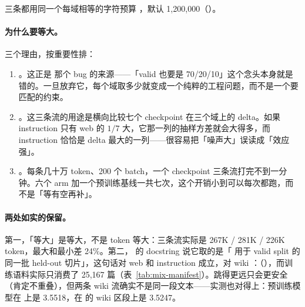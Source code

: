 三条都用同一个每域相等的字符预算 ，默认 1{,}200{,}000（）。

\paragraph{为什么要等大。}三个理由，按重要性排：

\begin{enumerate}[label=(\arabic*)]\itemsep3pt
  \item {}。这正是  那个 bug 的来源——「valid 也要是 70/20/10」这个念头本身就是错的。一旦放弃它，每个域取多少就变成一个纯粹的工程问题，而不是一个要匹配的约束。
  \item {}。这三条流的用途是横向比较七个 checkpoint 在三个域上的 delta。如果 instruction 只有 web 的 $1/7$ 大，它那一列的抽样方差就会大得多，而 instruction 恰恰是 delta 最大的一列——很容易把「噪声大」误读成「效应强」。
  \item {}。每条几十万 token、200 个 batch，一个 checkpoint 三条流打完不到一分钟。六个 arm 加一个预训练基线一共七次，这个开销小到可以每次都跑，而不是「等有空再补」。
\end{enumerate}

\paragraph{两处如实的保留。}第一，「等大」是等大，不是 token 等大：三条流实际是 267K / 281K / 226K token，最大和最小差 24\%。第二， 的 docstring 说它取的是「 用于 valid split 的同一批 held-out 切片」，这句话对 web 和 instruction 成立，对 wiki ：（），而训练语料实际只消费了 25{,}167 篇（表~\ref{tab:mix-manifest}）。跳得更远只会更安全（肯定不重叠），但两条 wiki 流确实不是同一段文本——实测也对得上：预训练模型在  上是 3.5518，在  的 wiki 区段上是 3.5247。

